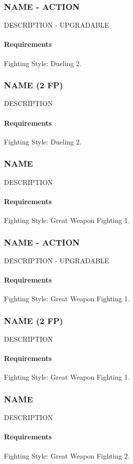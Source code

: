 \subsubsection{NAME - ACTION} \label{feat::name}
    DESCRIPTION - UPGRADABLE
    \paragraph{Requirements} Fighting Style: Dueling 2.
\subsubsection{NAME (2 FP)} \label{feat::name}
    DESCRIPTION
    \paragraph{Requirements} Fighting Style: Dueling 2.
\subsubsection{NAME} \label{feat::name}
    DESCRIPTION
    \paragraph{Requirements} Fighting Style: Great Weapon Fighting 1.
\subsubsection{NAME - ACTION} \label{feat::name}
    DESCRIPTION - UPGRADABLE
    \paragraph{Requirements} Fighting Style: Great Weapon Fighting 1.
\subsubsection{NAME (2 FP)} \label{feat::name}
    DESCRIPTION
    \paragraph{Requirements} Fighting Style: Great Weapon Fighting 1.
\subsubsection{NAME} \label{feat::name}
    DESCRIPTION
    \paragraph{Requirements} Fighting Style: Great Weapon Fighting 2.
